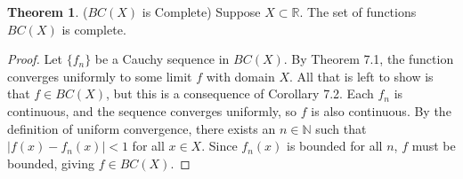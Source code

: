\documentclass{article}
\newcommand{\N}{\mathbb{N}}
\newcommand{\R}{\mathbb{R}}
\theoremstyle{definition}
\newtheorem{theorem}{Theorem}[section]
\begin{document}
\begin{theorem}($ BC(X) $ is Complete)
	Suppose $ X\subset \R $. The set of functions $ BC(X) $ is complete. 
\end{theorem}
\begin{proof}
	Let $ \{f_n\} $ be a Cauchy sequence in $ BC(X) $. By Theorem 7.1, the function converges uniformly to some limit $ f $ with domain $ X $. All that is left to show is that $ f\in BC(X) $, but this is a consequence of Corollary 7.2. Each $ f_n $ is continuous, and the sequence converges uniformly, so $ f $ is also continuous. By the definition of uniform convergence, there exists an $ n\in\N $ such that $ |f(x)-f_n(x)|<1 $ for all $ x\in X $. Since $ f_n(x) $ is bounded for all $ n $, $ f $ must be bounded, giving $ f\in BC(X) $. 
\end{proof}
\end{document}
